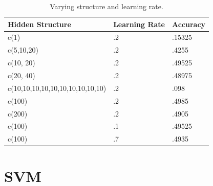 \documentclass[paper=a4, fontsize=11pt]{scrartcl} %
\begin{document}
	\begin{table}[h]
	\centering
	\caption{Varying structure and learning rate.}
	\label{tab:vary}
	\begin{tabular}{l|l|l}
	Hidden Structure                 & Learning Rate & Accuracy \\ \hline
	c(1)														 & .2						 & .15325		\\
	c(5,10,20)                       & .2            & .4255    \\
	c(10, 20)                        & .2            & .49525   \\
	c(20, 40)                        & .2            & .48975   \\
	c(10,10,10,10,10,10,10,10,10,10) & .2            & .098     \\
	c(100)                           & .2            & .4985    \\
	c(200)                           & .2            & .4905    \\
	c(100)                           & .1            & .49525   \\
	c(100)                           & .7            & .4935   
	\end{tabular}
	\end{table}


\clearpage
\section{SVM}
\end{document}
